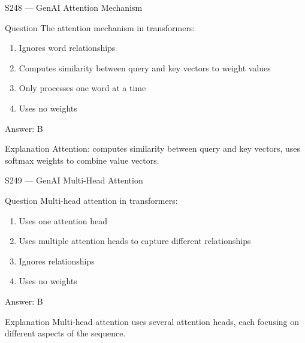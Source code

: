 \documentclass[aspectratio=169,8pt]{beamer}
\begin{document}
\begin{frame}{S248 --- GenAI Attention Mechanism}
	\begin{block}{Question}
		The attention mechanism in transformers:
		\begin{enumerate}
			\item Ignores word relationships
			\item Computes similarity between query and key vectors to weight values
			\item Only processes one word at a time
			\item Uses no weights
		\end{enumerate}
	\end{block}
	\begin{exampleblock}{Answer: B}\end{exampleblock}
	\begin{block}{Explanation}
		Attention: computes similarity between query and key vectors, uses softmax weights to combine value vectors.
	\end{block}
\end{frame}

\begin{frame}{S249 --- GenAI Multi-Head Attention}
	\begin{block}{Question}
		Multi-head attention in transformers:
		\begin{enumerate}
			\item Uses one attention head
			\item Uses multiple attention heads to capture different relationships
			\item Ignores relationships
			\item Uses no weights
		\end{enumerate}
	\end{block}
	\begin{exampleblock}{Answer: B}\end{exampleblock}
	\begin{block}{Explanation}
		Multi-head attention uses several attention heads, each focusing on different aspects of the sequence.
	\end{block}
\end{frame}
\end{document}
